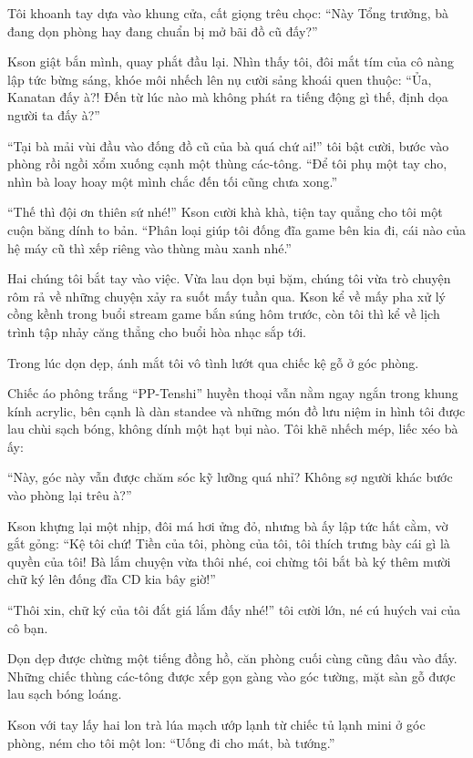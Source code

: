 \documentclass[../main.tex]{subfiles}
\begin{document}
Tôi khoanh tay dựa vào khung cửa, cất giọng trêu chọc: ``Này Tổng trưởng, bà đang dọn phòng hay đang chuẩn bị mở bãi đồ cũ đấy?''

Kson giật bắn mình, quay phắt đầu lại. Nhìn thấy tôi, đôi mắt tím của cô nàng lập tức bừng sáng, khóe môi nhếch lên nụ cười sảng khoái quen thuộc: ``Ủa, Kanatan đấy à?! Đến từ lúc nào mà không phát ra tiếng động gì thế, định dọa người ta đấy à?''

``Tại bà mải vùi đầu vào đống đồ cũ của bà quá chứ ai!'' tôi bật cười, bước vào phòng rồi ngồi xổm xuống cạnh một thùng các-tông. ``Để tôi phụ một tay cho, nhìn bà loay hoay một mình chắc đến tối cũng chưa xong.''

``Thế thì đội ơn thiên sứ nhé!'' Kson cười khà khà, tiện tay quẳng cho tôi một cuộn băng dính to bản. ``Phân loại giúp tôi đống đĩa game bên kia đi, cái nào của hệ máy cũ thì xếp riêng vào thùng màu xanh nhé.''

Hai chúng tôi bắt tay vào việc. Vừa lau dọn bụi bặm, chúng tôi vừa trò chuyện rôm rả về những chuyện xảy ra suốt mấy tuần qua. Kson kể về mấy pha xử lý cồng kềnh trong buổi stream game bắn súng hôm trước, còn tôi thì kể về lịch trình tập nhảy căng thẳng cho buổi hòa nhạc sắp tới.

Trong lúc dọn dẹp, ánh mắt tôi vô tình lướt qua chiếc kệ gỗ ở góc phòng.

Chiếc áo phông trắng ``PP-Tenshi'' huyền thoại vẫn nằm ngay ngắn trong khung kính acrylic, bên cạnh là dàn standee và những món đồ lưu niệm in hình tôi được lau chùi sạch bóng, không dính một hạt bụi nào. Tôi khẽ nhếch mép, liếc xéo bà ấy:

``Này, góc này vẫn được chăm sóc kỹ lưỡng quá nhỉ? Không sợ người khác bước vào phòng lại trêu à?''

Kson khựng lại một nhịp, đôi má hơi ửng đỏ, nhưng bà ấy lập tức hất cằm, vờ gắt gỏng: ``Kệ tôi chứ! Tiền của tôi, phòng của tôi, tôi thích trưng bày cái gì là quyền của tôi! Bà lắm chuyện vừa thôi nhé, coi chừng tôi bắt bà ký thêm mười chữ ký lên đống đĩa CD kia bây giờ!''

``Thôi xin, chữ ký của tôi đắt giá lắm đấy nhé!'' tôi cười lớn, né cú huých vai của cô bạn.

Dọn dẹp được chừng một tiếng đồng hồ, căn phòng cuối cùng cũng đâu vào đấy. Những chiếc thùng các-tông được xếp gọn gàng vào góc tường, mặt sàn gỗ được lau sạch bóng loáng.

Kson với tay lấy hai lon trà lúa mạch ướp lạnh từ chiếc tủ lạnh mini ở góc phòng, ném cho tôi một lon: ``Uống đi cho mát, bà tướng.''
\end{document}

